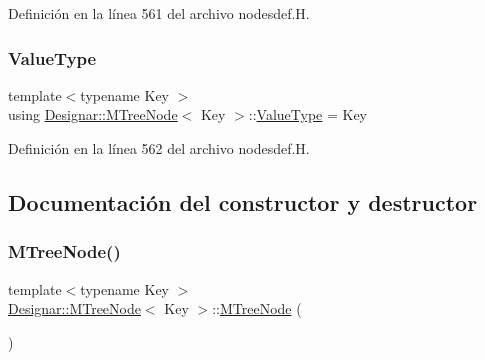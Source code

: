 Definición en la línea 561 del archivo nodesdef.\+H.

\mbox{\label{class_designar_1_1_m_tree_node_a0f65c3ec41fb24ab7764c01cd949d6be}} 
\subsubsection{\texorpdfstring{Value\+Type}{ValueType}}
{\footnotesize\ttfamily template$<$typename Key $>$ \\
using \hyperlink{class_designar_1_1_m_tree_node}{Designar\+::\+M\+Tree\+Node}$<$ Key $>$\+::\hyperlink{class_designar_1_1_m_tree_node_a0f65c3ec41fb24ab7764c01cd949d6be}{Value\+Type} =  Key}



Definición en la línea 562 del archivo nodesdef.\+H.



\subsection{Documentación del constructor y destructor}
\mbox{\label{class_designar_1_1_m_tree_node_a8312cbf8769f92de4348c69f9f7fce40}} 
\subsubsection{\texorpdfstring{M\+Tree\+Node()}{MTreeNode()}\hspace{0.1cm}{\footnotesize\ttfamily [1/3]}}
{\footnotesize\ttfamily template$<$typename Key $>$ \\
\hyperlink{class_designar_1_1_m_tree_node}{Designar\+::\+M\+Tree\+Node}$<$ Key $>$\+::\hyperlink{class_designar_1_1_m_tree_node}{M\+Tree\+Node} (\begin{DoxyParamCaption}{ }\end{DoxyParamCaption})\hspace{0.3cm}{\ttfamily [default]}}

\mbox{\label{class_designar_1_1_m_tree_node_a823994c2cdeba2768bdb10163f27a6b1}} 
